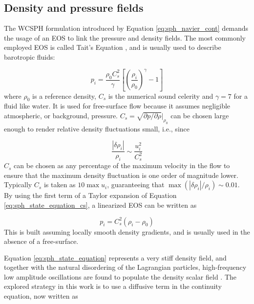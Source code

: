 \subsection{Density and pressure fields}
\label{sec:eos}

The \ac{WCSPH} formulation introduced by Equation \eqref{eq:sph_navier_cont} demands the usage of an \ac{EOS} to link the pressure and density fields. The most commonly employed \ac{EOS} is called Tait's Equation \citep{Batchelor-2000}, and is usually used to describe barotropic fluids:

%
\begin{equation} \label{eq:sph_state_equation}
	p_i = \frac{\rho_0 C_s^2}{\gamma} \left[ \left( \frac{\rho_i}{\rho_0} \right)^{\gamma} -1 \right]
\end{equation}
%
\noindent where $\rho_0$ is a reference density, $C_s$ is the numerical sound celerity and $\gamma=7$ for a fluid like water. It is used for free-surface flow because it assumes negligible atmospheric, or background, pressure.
$C_s=\sqrt{\partial p / \partial \rho}|_{\rho_0}$ \citep{Batchelor-2000} can be chosen large enough to render relative density fluctuations small, i.e., since

%
\begin{equation} \label{eq:sph_state_equation_cs}
	\frac{|\delta\rho_i|}{\rho_i} \sim \frac{u_i^2}{C_s^2}
\end{equation}
%
$C_s$ can be chosen as any percentage of the maximum velocity in the flow to ensure that the maximum density fluctuation is one order of magnitude lower. Typically $C_s$ is taken as $10\max u_i$, guaranteeing that $\max({|\delta\rho_i|}/{\rho_i}) \sim 0.01$. By using the first term of a Taylor expansion of Equation \eqref{eq:sph_state_equation_cs}, a linearized \ac{EOS} can be written as

%
\begin{equation} \label{eq:sph_state_equation_linear}
	p_i = {C_s^2}(\rho_i-\rho_0)
\end{equation}
%
This is built assuming locally smooth density gradients, and is usually used in the absence of a free-surface.

Equation \eqref{eq:sph_state_equation} represents a very stiff density field, and together with the natural disordering of the Lagrangian particles, high-frequency low amplitude oscillations are found to populate the density scalar field \citep{Molteni-2009}. The explored strategy in this work is to use a diffusive term in the continuity equation, now written as

